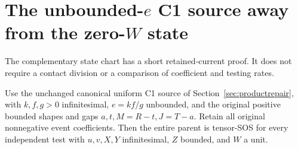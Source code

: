 \section{The unbounded-$e$ C1 source away from the zero-$W$ state}
\label{sec:c1-unbounded-e-w-unit}

The complementary state chart has a short retained-current proof.  It
does not require a contact division or a comparison of coefficient and
testing rates.

\begin{theorem}
Use the unchanged canonical uniform C1 source of
Section~\ref{sec:productrepair}, with $k,f,g>0$ infinitesimal,
$e=kf/g$ unbounded, and the original positive bounded shapes and gaps
$a,t,M=R-t,J=T-a$.  Retain all original nonnegative event coefficients.
Then the entire parent is tensor-SOS for every independent test with
$u,v,X,Y$ infinitesimal, $Z$ bounded, and $W$ a unit.
\end{theorem}
